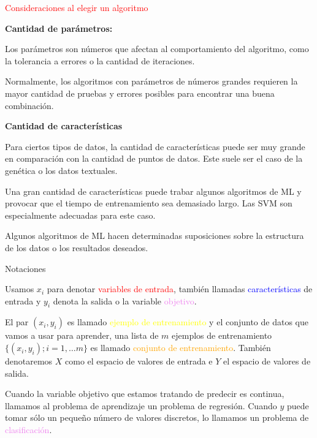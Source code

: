 \documentclass[11pt]{beamer}
\begin{document}
\begin{frame}{\textcolor{red}{Consideraciones al elegir un algoritmo}}
\begin{itemize}
\scriptsize{\item \textbf{Cantidad de par\'ametros:}

Los par\'ametros son n\'umeros que afectan al comportamiento del algoritmo, como la tolerancia a errores o la cantidad de iteraciones. 

Normalmente, los algoritmos con par\'ametros de n\'umeros grandes requieren la mayor cantidad de pruebas y errores posibles para encontrar una buena combinaci\'on.

\item \textbf{Cantidad de caracter\'isticas}

Para ciertos tipos de datos, la cantidad de caracter\'isticas puede ser muy grande en comparación con la cantidad de puntos de datos. Este suele ser el caso de la gen\'etica o los datos textuales.

Una gran cantidad de caracter\'isticas puede trabar algunos algoritmos de ML y provocar que el tiempo de entrenamiento sea demasiado largo. Las SVM son especialmente adecuadas para este caso.


\vspace{0.3cm}

Algunos algoritmos de ML hacen determinadas suposiciones sobre la estructura de los datos o los resultados deseados. 
}			
\end{itemize}

\end{frame}
\begin{frame}{\textcolor{green!35!blue}{Notaciones}}
\small{ Usamos $x_i$ para denotar \textcolor{red}{variables de entrada}, tambi\'en llamadas \textcolor{blue}{caracter\'isticas} de entrada y $y_i$ denota la salida o la variable \textcolor{violet}{objetivo}.
	

\vspace{0.2cm}

El par $(x_i, y_i)$ es llamado \textcolor{yellow}{ejemplo de entrenamiento} y el conjunto de datos que vamos a usar para aprender, una lista de $m$ ejemplos de entrenamiento $\{(x_i, y_i); i = 1, \dots m \}$ es llamado \textcolor{orange}{conjunto de entrenamiento}. Tambi\'en denotaremos $X$  como el espacio de valores de entrada e $Y$ el espacio de valores de salida. 
 

\vspace{0.2cm}

Cuando la variable objetivo que estamos tratando de predecir es continua, llamamos al problema de aprendizaje un problema de \textcolor{green!65!blue}{regresi\'on}. Cuando $y$ puede tomar s\'olo un peque\~no n\'umero de valores discretos, lo llamamos un problema de \textcolor{violet}{clasificaci\'on}.

}

\end{frame}
\end{document}
